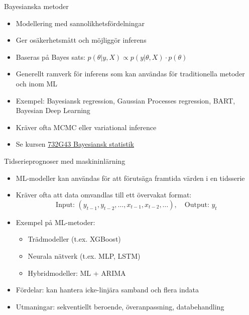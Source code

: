 \documentclass[10pt,english]{beamer}
\begin{document}
\begin{frame}{Bayesianska metoder}
  \begin{itemize}
    \item Modellering med sannolikhetsfördelningar
    \item Ger osäkerhetsmått och möjliggör inferens
    \item Baseras på Bayes sats: $p(\theta |y,X) \propto p(y|\theta,X) \cdot p(\theta)$
    \item Generellt ramverk för inferens som kan användas för traditionella metoder och inom ML
    \item Exempel: Bayesiansk regression, Gaussian Processes regression, BART, Bayesian Deep Learning
    \item Kräver ofta MCMC eller variational inference
    \item Se kursen  \href{https://studieinfo.liu.se/kurs/732G43}{732G43 Bayesiansk statistik}
  \end{itemize}
\end{frame}

\begin{frame}{Tidserieprognoser med maskininlärning}
  \begin{itemize}
    \item ML-modeller kan användas för att förutsäga framtida värden i en tidsserie
    \item Kräver ofta att data omvandlas till ett övervakat format:
    \[
    \text{Input: } (y_{t-1}, y_{t-2}, \dots, x_{t-1}, x_{t-2}, \dots), \quad \text{Output: } y_t
    \]
    \item Exempel på ML-metoder:
    \begin{itemize}
      \item Trädmodeller (t.ex. XGBoost)
      \item Neurala nätverk (t.ex. MLP, LSTM)
      \item Hybridmodeller: ML + ARIMA
    \end{itemize}
    \item Fördelar: kan hantera icke-linjära samband och flera indata
    \item Utmaningar: sekventiellt beroende, överanpassning, databehandling
  \end{itemize}
\end{frame}
\end{document}
